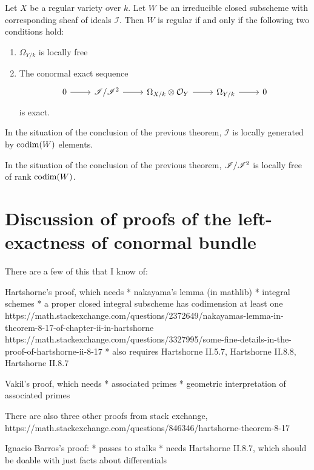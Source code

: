 \begin{thm}
	[Hartshorne II.8.17]
	Let \(X\) be a regular variety over \(k\).
	Let \(W\) be an irreducible closed subscheme 
	with corresponding sheaf of ideals \(\mathscr{I}\).
	Then \(W\) is regular if and only if the following
	two conditions hold:
	\begin{enumerate}[(1)]
		\item \(\Omega_{Y / k}\) is locally free
		\item The conormal exact sequence
			\[
			\begin{tikzcd}
			0 \arrow{r}{} & \conormal \arrow{r}{} & 
			\Omega_{X / k} \otimes \mathcal{O}_{Y}  \arrow{r}{} & 
			\Omega_{Y / k} \arrow{r}{} & 0
			\end{tikzcd}
			\]
			is exact.
	\end{enumerate}
\end{thm}

\begin{cor}
	In the situation of the conclusion of the previous theorem, 
	\(\mathscr{I}\) is locally generated by 
	\(\operatorname{codim}(W)\) elements.
\end{cor}

\begin{cor}
	In the situation of the conclusion of the previous theorem,
	\(\mathscr{I} / \mathscr{I}^{2}\) is locally free of rank \(\operatorname{codim}(W)\).
\end{cor}

\section{Discussion of proofs of the left-exactness of conormal bundle}

There are a few of this that I know of:

Hartshorne's proof, which needs
* nakayama's lemma (in mathlib)
* integral schemes
* a proper closed integral subscheme has codimension at least one
https://math.stackexchange.com/questions/2372649/nakayamas-lemma-in-theorem-8-17-of-chapter-ii-in-hartshorne
https://math.stackexchange.com/questions/3327995/some-fine-details-in-the-proof-of-hartshorne-ii-8-17
* also requires Hartshorne II.5.7, Hartshorne II.8.8, Hartshorne II.8.7

Vakil's proof, which needs
* associated primes
* geometric interpretation of associated primes

There are also three other proofs from stack exchange,
https://math.stackexchange.com/questions/846346/hartshorne-theorem-8-17

Ignacio Barros's proof:
* passes to stalks
* needs Hartshorne II.8.7, which should be doable with just 
   facts about differentials


